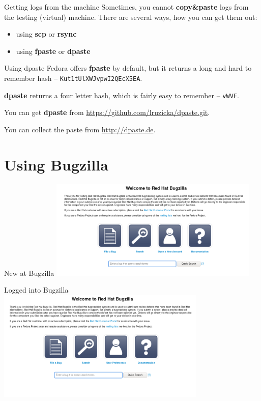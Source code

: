 \documentclass[12pt,aspectratio=169]{beamer}
\begin{document}
\begin{frame}{Getting logs from the machine}
Sometimes, you cannot \textbf{copy\&paste} logs from the testing (virtual) machine. There are several ways, how you can get them out:

\begin{itemize}
 \item using \textbf{scp} or \textbf{rsync}
 \item using \textbf{fpaste} or \textbf{dpaste}	
\end{itemize}
\end{frame}

\begin{frame}{Using dpaste}
Fedora offers \textbf{fpaste} by default, but it returns a long and hard to remember hash -- \texttt{Kut1tUlXWJvpwI2QEcX5EA}. 

\vspace{5pt}

\textbf{dpaste} returns a four letter hash, which is fairly easy to remember -- \texttt{vWVF}.

\vspace{5pt}

You can get \textbf{dpaste} from {\color{blue}\url{https://github.com/lruzicka/dpaste.git}}.

\vspace{5pt}

You can collect the paste from {\color{blue}\url{http://dpaste.de}}.

\end{frame}

\section{Using Bugzilla}
\begin{frame}{New at Bugzilla}
\includegraphics[width=10cm]{images/bz_new.png}
\end{frame}

\begin{frame}{Logged into Bugzilla}
\includegraphics[width=10cm]{images/bz_logged.png}
\end{frame}
\end{document}

